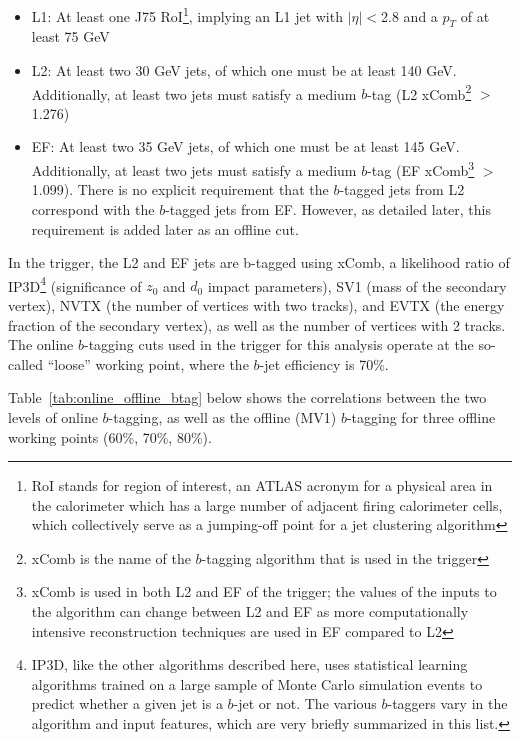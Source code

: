 \begin{itemize}
    \item L1: At least one J75 RoI\footnote{RoI stands for region of interest, an ATLAS acronym
    for a physical area in the calorimeter which has a large number of adjacent firing calorimeter
    cells, which collectively serve as a jumping-off point for a jet clustering algorithm}, implying an L1 
    jet with $|\eta|<$2.8 and a $p_T$ of at least 75 GeV
    \item L2: At least two 30 GeV jets, of which one must be at least 140 GeV. Additionally, at least two
jets must satisfy a medium $b$-tag (L2 xComb\footnote{xComb is the name of the $b$-tagging algorithm
that is used in the trigger} $>$ 1.276)
    \item EF: At least two 35 GeV jets, of which one must be at least 145 GeV. Additionally, at least two
jets must satisfy a medium $b$-tag (EF xComb\footnote{xComb is used in both L2 and EF of the trigger;
the values of the inputs to the algorithm can change between L2 and EF as more computationally intensive
reconstruction techniques are used in EF compared to L2} $>$ 1.099). There is no explicit requirement that the
$b$-tagged jets from L2 correspond with the $b$-tagged jets from EF. However, as detailed later, this
requirement is added later as an offline cut.
\end{itemize}


In the trigger, the L2 and EF jets are b-tagged using xComb, a likelihood ratio of IP3D\footnote{IP3D, like
the other algorithms described here, uses statistical learning algorithms trained on a large sample
of Monte Carlo simulation events to predict whether a given jet is a $b$-jet or not.  The various $b$-taggers
vary in the algorithm and input features, which are very briefly summarized in this list. } 
(significance of $z_0$ and $d_0$ impact parameters), SV1 (mass of the secondary vertex), NVTX (the number of
vertices with two tracks), and EVTX (the energy fraction of the secondary vertex), as well as the number
of vertices with 2 tracks. 
The online $b$-tagging cuts used in the trigger for this analysis operate at the so-called ``loose''
working point, where the $b$-jet efficiency
is 70\%.

Table~\ref{tab:online_offline_btag} below shows the correlations between the two levels of online
$b$-tagging, as well as the offline (MV1) $b$-tagging for three offline working points (60\%, 70\%,
80\%).  


